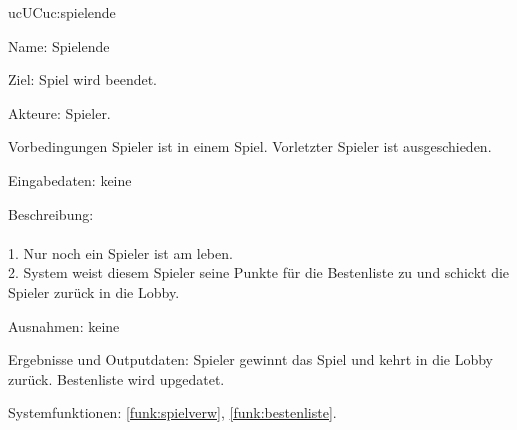 \begin{description}[leftmargin=5em, style=sameline]
 	\begin{lhp}{uc}{UC}{uc:spielende}
    	\item [Name:] Spielende
    	\item [Ziel:] Spiel wird beendet.
    	\item [Akteure:] Spieler.
    	\item [Vorbedingungen] Spieler ist in einem Spiel. Vorletzter Spieler ist ausgeschieden.
      	\item [Eingabedaten:] keine
    	\item [Beschreibung:] \hfill\\ \hfill\\
    	1. Nur noch ein Spieler ist am leben.\\
    	2. System weist diesem Spieler seine Punkte für die Bestenliste zu und schickt die Spieler zurück in die Lobby.\\
    	\item [Ausnahmen:] keine
    	\item [Ergebnisse und Outputdaten:] Spieler gewinnt das Spiel und kehrt in die Lobby zurück.
    	Bestenliste wird upgedatet.
    	\item [Systemfunktionen:] \ref{funk:spielverw}, \ref{funk:bestenliste}.
    \end{lhp}
    
\end{description}